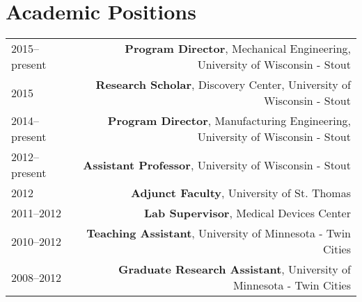 \section*{Academic Positions}
\begin{tabular}{L!{\VRule}R}
2015--present&{\bf Program Director}, Mechanical Engineering, University of Wisconsin - Stout\\
2015&{\bf Research Scholar}, Discovery Center, University of Wisconsin - Stout\\
2014--present&{\bf Program Director}, Manufacturing Engineering, University of Wisconsin - Stout\\
2012--present&{\bf Assistant Professor}, University of Wisconsin - Stout\\
2012&\textbf{Adjunct Faculty}, University of St. Thomas\\
2011--2012&\textbf{Lab Supervisor}, Medical Devices Center\\
2010--2012&\textbf{Teaching Assistant}, University of Minnesota - Twin Cities\\
2008--2012&\textbf{Graduate Research Assistant}, University of Minnesota - Twin Cities\\
\end{tabular}